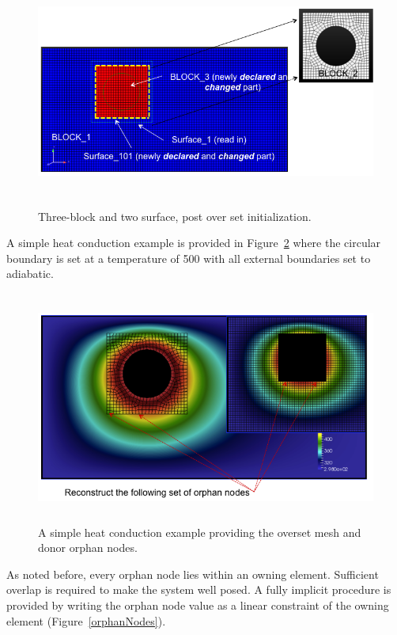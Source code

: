 \begin{figure} [h]
\centerline{\includegraphics[height=3.0in]{images/oversetBlockOneTwoCut}}
\vspace{0.1in}
\caption{Three-block and two surface, post over set initialization.}
\label{oversetBlockOneTwoCut}
\end{figure}

A simple heat conduction example is provided in Figure~\ref{oversetHC} where
the circular boundary is set at a temperature of 500 with all external 
boundaries set to adiabatic.

\begin{figure} [h]
\centerline{\includegraphics[height=3.0in]{images/oversetHC}}
\vspace{0.1in}
\caption{A simple heat conduction example providing the overset mesh and
donor orphan nodes.}
\label{oversetHC}
\end{figure}

As noted before, every orphan node lies within an owning element. Sufficient
overlap is required to make the system well posed. A fully implicit procedure
is provided by writing the orphan node value as a linear constraint of the
owning element (Figure~\ref{orphanNodes}).

